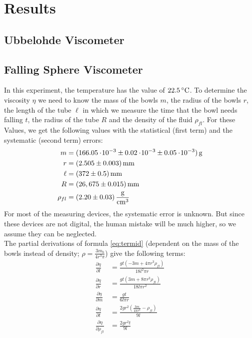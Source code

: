 \section{Results}

\subsection{Ubbelohde Viscometer}


\subsection{Falling Sphere Viscometer}
In this experiment, the temperature has the value of $22.5\C$. To determine the viscosity $\eta$ we need to know the mass of the bowls $m$, the radius of the bowls $r$, the length of the tube $\ell$ in which we measure the time that the bowl needs falling $t$, the radius of the tube $R$ and the density of the fluid $\rho_{fl}$. For these Values, we get the following values with the statistical (first term) and the systematic (second term) errors:
\begin{align*}
m &= \unit[(166.05\e{-3} \pm 0.02 \e{-3} \pm 0.05\e{-3})]{g}\\
r &= \unit[(2.505 \pm 0.003)]{mm}\\
\ell &= \unit[(372 \pm 0.5)]{mm}\\
R &= \unit[(26,675 \pm 0.015)]{mm}\\
\rho_{fl} &= \unit[(2.20 \pm 0.03)]{\frac{g}{cm^3}}
\end{align*}
For most of the measuring devices, the systematic error is unknown. But since these devices are not digital, the human mistake will be much higher, so we assume they can be neglected. \\
The partial derivations of formula \ref{eq:termid} (dependent on the mass of the bowls instead of density; $\rho = \frac{3m_b}{4r^3\pi}$) give the following terms:
\begin{align*}
\frac{\partial \eta}{\partial l}  &= \frac{g t \left(-3 m+4 \pi  r^3 \rho_{fl}\right)}{18 l^2 \pi  r}\\
\frac{\partial \eta}{\partial r} &= \frac{g t \left(3 m+8 \pi  r^3 \rho_{fl}\right)}{18 l \pi  r^2}\\
\frac{\partial \eta}{\partial m} &= \frac{g t}{6 l \pi  r}\\
\frac{\partial \eta}{\partial t} &= \frac{2 g r^2 \left(\frac{3 m}{4 \pi  r^3}- \rho_{fl}\right)}{9 l}\\
\frac{\partial \eta}{\partial \rho_{fl}} &= \frac{2 g r^2 t}{9 l}
\end{align*}

